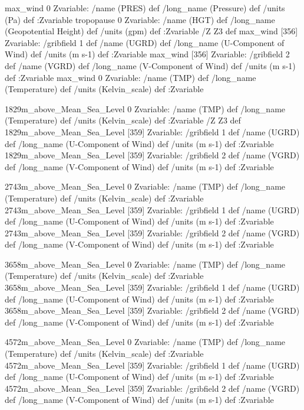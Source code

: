 \begin{ingrid}

max_wind 0 Zvariable: /name (PRES) def /long_name (Pressure) def /units (Pa) def :Zvariable
tropopause 0 Zvariable: /name (HGT) def /long_name (Geopotential Height) def /units (gpm) def :Zvariable
/Z Z3 def
max_wind [356] Zvariable: /gribfield 1 def /name (UGRD) def /long_name (U-Component of Wind) def /units (m s-1) def :Zvariable
max_wind [356] Zvariable: /gribfield 2 def /name (VGRD) def /long_name (V-Component of Wind) def /units (m s-1) def :Zvariable
max_wind  0 Zvariable: /name (TMP) def /long_name (Temperature) def /units (Kelvin_scale) def :Zvariable

\end{ingrid}
\begin{ingrid}

1829m_above_Mean_Sea_Level 0 Zvariable: /name (TMP) def /long_name (Temperature) def /units (Kelvin_scale) def :Zvariable
/Z Z3 def
1829m_above_Mean_Sea_Level [359] Zvariable: /gribfield 1 def /name (UGRD) def /long_name (U-Component of Wind) def /units (m s-1) def :Zvariable
1829m_above_Mean_Sea_Level [359] Zvariable: /gribfield 2 def /name (VGRD) def /long_name (V-Component of Wind) def /units (m s-1) def :Zvariable

2743m_above_Mean_Sea_Level 0 Zvariable: /name (TMP) def /long_name (Temperature) def /units (Kelvin_scale) def :Zvariable
2743m_above_Mean_Sea_Level [359] Zvariable: /gribfield 1 def /name (UGRD) def /long_name (U-Component of Wind) def /units (m s-1) def :Zvariable
2743m_above_Mean_Sea_Level [359] Zvariable: /gribfield 2 def /name (VGRD) def /long_name (V-Component of Wind) def /units (m s-1) def :Zvariable

3658m_above_Mean_Sea_Level 0 Zvariable: /name (TMP) def /long_name (Temperature) def /units (Kelvin_scale) def :Zvariable
3658m_above_Mean_Sea_Level [359] Zvariable: /gribfield 1 def /name (UGRD) def /long_name (U-Component of Wind) def /units (m s-1) def :Zvariable
3658m_above_Mean_Sea_Level [359] Zvariable: /gribfield 2 def /name (VGRD) def /long_name (V-Component of Wind) def /units (m s-1) def :Zvariable

4572m_above_Mean_Sea_Level 0 Zvariable: /name (TMP) def /long_name (Temperature) def /units (Kelvin_scale) def :Zvariable
4572m_above_Mean_Sea_Level [359] Zvariable: /gribfield 1 def /name (UGRD) def /long_name (U-Component of Wind) def /units (m s-1) def :Zvariable
4572m_above_Mean_Sea_Level [359] Zvariable: /gribfield 2 def /name (VGRD) def /long_name (V-Component of Wind) def /units (m s-1) def :Zvariable

\end{ingrid}
